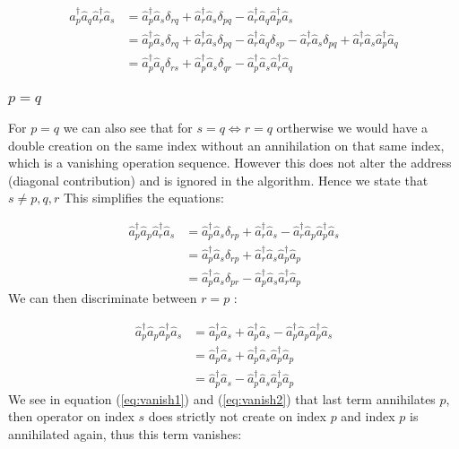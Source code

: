 \documentclass[12p]{article}
\begin{document}
\begin{align}
  \hat{a}^\dagger_p \hat{a}_q \hat{a}^\dagger_r \hat{a}_s & = \hat{a}^\dagger_p \hat{a}_s \delta_{rq} + \hat{a}^\dagger_r  \hat{a}_s \delta_{pq} - \hat{a}^\dagger_r \hat{a}_q \hat{a}^\dagger_p \hat{a}_s \\
  & = \hat{a}^\dagger_p \hat{a}_s \delta_{rq} + \hat{a}^\dagger_r \hat{a}_s \delta_{pq} - \hat{a}^\dagger_r \hat{a}_q  \delta_{sp} - \hat{a}^\dagger_r \hat{a}_s \delta_{pq} + \hat{a}^\dagger_r \hat{a}_s \hat{a}^\dagger_p \hat{a}_q \\
  & = \hat{a}^\dagger_p \hat{a}_q \delta_{rs} + \hat{a}^\dagger_p \hat{a}_s \delta_{qr} - \hat{a}^\dagger_p \hat{a}_s \hat{a}^\dagger_r \hat{a}_q
\end{align}

\subsubsection{$p = q$} \label{p=q}
For $p = q$ we can also see that for $s = q \iff r = q$ ortherwise we would have a double creation on the same index without an annihilation on that same index, which is a vanishing operation sequence. However this does not alter the address (diagonal contribution) and is ignored in the algorithm. Hence we state that $ s \neq p, q, r $ This simplifies the equations:

\begin{align}
  \hat{a}^\dagger_p \hat{a}_p \hat{a}^\dagger_r \hat{a}_s & = \hat{a}^\dagger_p \hat{a}_s \delta_{rp} + \hat{a}^\dagger_r  \hat{a}_s - \hat{a}^\dagger_r \hat{a}_p \hat{a}^\dagger_p \hat{a}_s \\
  & = \hat{a}^\dagger_p \hat{a}_s \delta_{rp} + \hat{a}^\dagger_r \hat{a}_s \hat{a}^\dagger_p \hat{a}_p \\
  & = \hat{a}^\dagger_p \hat{a}_s \delta_{pr} - \hat{a}^\dagger_p \hat{a}_s \hat{a}^\dagger_r \hat{a}_p
\end{align}
We can then discriminate between $r = p$ :

\begin{align}
  \hat{a}^\dagger_p \hat{a}_p \hat{a}^\dagger_p \hat{a}_s & = \hat{a}^\dagger_p \hat{a}_s + \hat{a}^\dagger_p \hat{a}_s - \hat{a}^\dagger_p \hat{a}_p \hat{a}^\dagger_p \hat{a}_s  \\
  & = \hat{a}^\dagger_p \hat{a}_s + \hat{a}^\dagger_p \hat{a}_s \hat{a}^\dagger_p \hat{a}_p \label{eq:vanish1} \\
  & = \hat{a}^\dagger_p \hat{a}_s - \hat{a}^\dagger_p \hat{a}_s \hat{a}^\dagger_p \hat{a}_p \label{eq:vanish2}
\end{align}
We see in equation (\ref{eq:vanish1}) and (\ref{eq:vanish2}) that last term annihilates $p$, then operator on index $s$ does strictly not create on index $p$ and index $p$ is annihilated again, thus this term vanishes:
\end{document}
